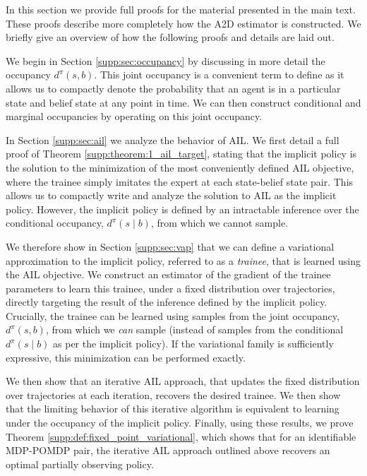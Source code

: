 \label{supp:thoery}

\newcommand{\klbars}{\ ||\ }
\newcommand{\lspsqb }{\left[ \hspace*{0.1em} }
\newcommand{\rspsqb}{\hspace*{0.1em} \right]}

In this section we provide full proofs for the material presented in the main text.  These proofs describe more completely how the A2D estimator is constructed.  We briefly give an overview of how the following proofs and details are laid out.

We begin in Section \ref{supp:sec:occupancy} by discussing in more detail the occupancy $d^{\pi}(s,b)$.  This joint occupancy is a convenient term to define as it allows us to compactly denote the probability that an agent is in a particular state and belief state at any point in time.  We can then construct conditional and marginal occupancies by operating on this joint occupancy.  

In Section \ref{supp:sec:ail} we analyze the behavior of AIL.  We first detail a full proof of Theorem \ref{supp:theorem:1_ail_target}, stating that the implicit policy is the solution to the minimization of the most conveniently defined AIL objective, where the trainee simply imitates the expert at each state-belief state pair.  This allows us to compactly write and analyze the solution to AIL as the implicit policy.  However, the implicit policy is defined by an intractable inference over the conditional occupancy, $d^{\pi}(s \mid b)$, from which we cannot sample.  

We therefore show in Section \ref{supp:sec:vap} that we can define a variational approximation to the implicit policy, referred to as a \emph{trainee}, that is learned using the AIL objective.  We construct an estimator of the gradient of the trainee parameters to learn this trainee, under a fixed distribution over trajectories, directly targeting the result of the inference defined by the implicit policy.  Crucially, the trainee can be learned using samples from the joint occupancy, $d^{\pi}(s,b)$, from which we \emph{can} sample (instead of samples from the conditional $d^{\pi}( s \mid b )$ as per the implicit policy).  If the variational family is sufficiently expressive, this minimization can be performed exactly. 

We then show that an iterative AIL approach, that updates the fixed distribution over trajectories at each iteration, recovers the desired trainee.  We then show that the limiting behavior of this iterative algorithm is equivalent to learning under the occupancy of the implicit policy.  Finally, using these results, we prove Theorem \ref{supp:def:fixed_point_variational}, which shows that for an identifiable MDP-POMDP pair, the iterative AIL approach outlined above recovers an optimal partially observing policy.  

